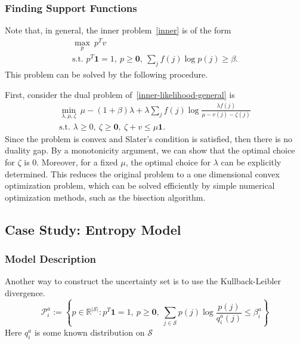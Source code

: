 \documentclass[11pt,reqno]{amsart}
\theoremstyle{definition}
\numberwithin{equation}{section}
\theoremstyle{remark}
\begin{document}

\subsubsection{Finding Support Functions}
Note that, in general, the inner problem~\ref{inner} is of the form
\begin{equation}\label{inner-likelihood-general}
\begin{gathered}
    \max_{p}~p^Tv\\
    \text{s.t. }p^T\textbf{1}=1,~p\geq\textbf{0},~\sum_{j}f(j)\log p(j)\geq\beta.
\end{gathered}
\end{equation}
This problem can be solved by the following procedure.

\medskip

First, consider the dual problem of~\ref{inner-likelihood-general} is
\begin{equation}\label{likelihood-dual}
\begin{gathered}
    \min_{\lambda,\mu,\zeta}~\mu-(1+\beta)\lambda+\lambda\sum_{j}f(j)\log\frac{\lambda f(j)}{\mu-v(j)-\zeta(j)}\\
    \text{s.t. }\lambda\geq 0,~\zeta\geq\textbf{0},~\zeta+v\leq\mu\textbf{1}.
\end{gathered}
\end{equation}
Since the problem is convex and Slater's condition is satisfied, then there is no duality gap. By a monotonicity argument, we can show that the optimal choice for $\zeta$ is 0. Moreover, for a fixed $\mu$, the optimal choice for $\lambda$ can be explicitly determined. This reduces the original problem to a one dimensional convex optimization problem, which can be solved efficiently by simple numerical optimization methods, such as the bisection algorithm.


\subsection{Case Study: Entropy Model}


\subsubsection{Model Description}
Another way to construct the uncertainty set is to use the Kullback-Leibler divergence.
\begin{equation}\label{entropy-uncertainty-row}
    \mathcal{P}^a_i:=\left\{p\in\mathbb{R}^{|\mathcal{S}|}:p^T\textbf{1}=1,~p\geq\textbf{0},~\sum_{j\in\mathcal{S}}p(j)\log\frac{p(j)}{q^a_i(j)}\leq\beta^a_i\right\}
\end{equation}
Here $q^a_i$ is some known distribution on $\mathcal{S}$
\end{document}
